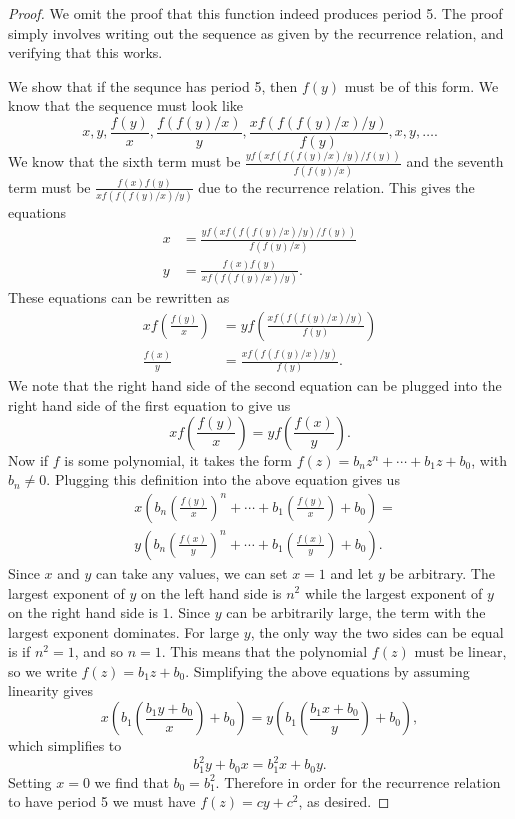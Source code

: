 \documentclass[12pt]{article}
\begin{document}
\begin{proof}
We omit the proof that this function indeed produces period 5. The proof simply involves writing out the sequence as given by the recurrence relation, and verifying that this works.

We show that if the sequnce has period 5, then $f(y)$ must be of this form. We know that the sequence must look like
\begin{equation*}
x,y, \frac{f(y)}{x}, \frac{f(f(y)/x)}{y}, \frac{xf( f(f(y)/x)/y)}{f(y)}, x, y, \dots .
\end{equation*}
We know that the sixth term must be $\frac{y f( xf(f(f(y)/x)/y)/f(y))}{f(f(y)/x)}$ and the seventh term must be $\frac{ f(x)f(y)}{xf(f(f(y)/x)/y)}$ due to the recurrence relation. This gives the equations
\begin{align*}
x &= \frac{y f( xf(f(f(y)/x)/y)/f(y))}{f(f(y)/x)}\\
y &= \frac{ f(x)f(y)}{xf(f(f(y)/x)/y)}.
\end{align*}
These equations can be rewritten as
\begin{align*}
xf\left(\frac{f(y)}{x}\right) &= y f\left( \frac{ xf(f(f(y)/x)/y)}{f(y)}\right) \\
\frac{f(x)}{y} &= \frac{ xf(f(f(y)/x)/y)}{f(y)}. 
\end{align*}
We note that the right hand side of the second equation can be plugged into the right hand side of the first equation to give us 
\begin{equation*}
xf\left(\frac{f(y)}{x}\right) = y f\left(\frac{f(x)}{y}\right).
\end{equation*}
Now if $f$ is some polynomial, it takes the form $f(z) = b_n z^n + \cdots + b_1 z + b_0$, with $b_n \neq 0$. Plugging this definition into the above equation gives us 
\begin{align*}
&x\left( b_n \left( \frac{f(y)}{x}\right)^n + \cdots + b_1 \left( \frac{f(y)}{x}\right) + b_0 \right) = \\
& y\left( b_n \left( \frac{f(x)}{y}\right)^n + \cdots + b_1 \left( \frac{f(x)}{y}\right) + b_0 \right). 
\end{align*}
Since $x$ and $y$ can take any values, we can set $x=1$ and let $y$ be arbitrary. The largest exponent of $y$ on the left hand side is $n^2$ while the largest exponent of $y$ on the right hand side is $1$. Since $y$ can be arbitrarily large, the term with the largest exponent dominates. For large $y$, the only way the two sides can be equal is if $n^2 = 1$, and so $n = 1$. This means that the polynomial $f(z)$ must be linear, so we write $f(z) =b_1 z + b_0$. Simplifying the above equations by assuming linearity gives
\begin{equation*}
x\left(b_1 \left( \frac{b_1 y + b_0}{x} \right) + b_0 \right) = y\left(b_1 \left( \frac{b_1 x + b_0}{y} \right) + b_0 \right),
\end{equation*}
which simplifies to 
\begin{equation*}
b_1^2 y + b_0 x = b_1^2 x + b_0 y.
\end{equation*}
Setting $x=0$ we find that $b_0=b_1^2$. Therefore in order for the recurrence relation to have period 5 we must have $f(z)=cy+c^2$, as desired. 
\end{proof}
\end{document}
